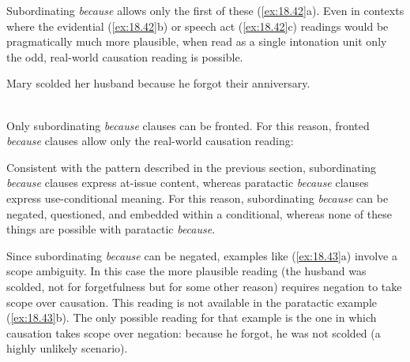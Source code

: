Subordinating \textit{because} allows only the first of these (\ref{ex:18.42}a). Even in contexts where the evidential (\ref{ex:18.42}b) or speech act (\ref{ex:18.42}c) readings would be pragmatically much more plausible, when read as a single intonation unit only the odd, real-world causation reading is possible.


\ea \label{ex:18.42}
\ea  Mary scolded her husband because he forgot their anniversary.\\
\\
                       \z
\z


Only subordinating \textit{because} clauses can be fronted. For this reason, fronted \textit{because} clauses allow only the real-world causation reading:


\ea \label{ex:18.15}
                       \z
\z


Consistent with the pattern described in the previous section, subordinating \textit{because} clauses express at-issue content, whereas paratactic \textit{because} clauses express use-conditional meaning. For this reason, subordinating \textit{because} can be negated, questioned, and embedded within a conditional, whereas none of these things are possible with paratactic \textit{because}.


Since subordinating \textit{because} can be negated, examples like (\ref{ex:18.43}a) involve a scope ambiguity. In this case the more plausible reading (the husband was scolded, not for forgetfulness but for some other reason) requires negation to take scope over causation. This reading is not available in the paratactic example (\ref{ex:18.43}b). The only possible reading for that example is the one in which causation takes scope over negation: because he forgot, he was not scolded (a highly unlikely scenario).


